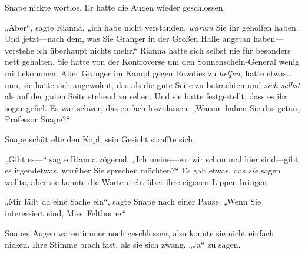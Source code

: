 Snape nickte wortlos. Er hatte die Augen wieder geschlossen.

„Aber“, sagte Rianna, „ich habe nicht verstanden, \emph{warum} Sie ihr geholfen haben. Und jetzt—nach dem, was Sie Granger in der Großen Halle angetan haben—verstehe ich überhaupt nichts mehr.“ Rianna hatte sich selbst nie für besonders nett gehalten. Sie hatte von der Kontroverse um den Sonnenschein-General wenig mitbekommen. Aber Granger im Kampf gegen Rowdies zu \emph{helfen}, hatte etwas…nun, sie hatte sich angewöhnt, das als die gute Seite zu betrachten und \emph{sich selbst} als auf der guten Seite stehend zu sehen. Und sie hatte festgestellt, dass es ihr sogar gefiel. Es war schwer, das einfach loszulassen. „Warum haben Sie das getan, Professor Snape?“

Snape schüttelte den Kopf, sein Gesicht straffte sich.

„Gibt es—“ sagte Rianna zögernd. „Ich meine—wo wir schon mal hier sind—gibt es irgendetwas, worüber Sie sprechen möchten?“ Es gab etwas, das \emph{sie} sagen wollte, aber sie konnte die Worte nicht über ihre eigenen Lippen bringen.

„Mir fällt da eine Sache ein“, sagte Snape nach einer Pause. „Wenn Sie interessiert sind, Miss~Felthorne.“

Snapes Augen waren immer noch geschlossen, also konnte sie nicht einfach nicken. Ihre Stimme brach fast, als sie sich zwang, „Ja“ zu sagen.

